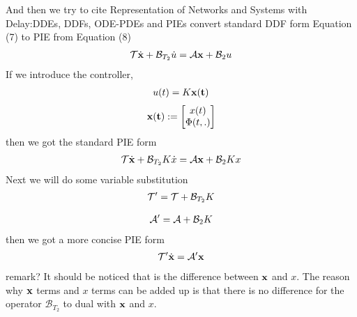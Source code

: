 \documentclass[twocolumn]{autart}    %
\begin{document}
And then we try to cite Representation of Networks and Systems with Delay:DDEs, DDFs, ODE-PDEs and PIEs convert standard DDF form Equation (7) to PIE from Equation (8) 
\begin{equation}
    \begin{aligned}
        \setlength{\arraycolsep}{0.9pt}
        \mathcal{T}\dot{\bold{x}}+\mathcal{B}_{T_{2}}\dot{u} = \mathcal{A}\bold{x}+\mathcal{B}_{2}u
    \end{aligned}
\end{equation}
If we introduce the controller,
\begin{equation}
    \begin{aligned}
        \setlength{\arraycolsep}{0.9pt}
        u(t) = K\bold{x(t)}
    \end{aligned}
\end{equation}
\begin{equation}
    \begin{aligned}
        \setlength{\arraycolsep}{0.9pt}
        \bold{x(t)} := \begin{bmatrix}
            x(t) \\
            \Phi(t,.)
        \end{bmatrix}\nonumber
    \end{aligned}
\end{equation}
then we got the standard PIE form 
\begin{equation}
    \begin{aligned}
        \setlength{\arraycolsep}{0.9pt}
        \mathcal{T}\dot{\bold{x}}+\mathcal{B}_{T_{2}}K\dot{x} = \mathcal{A}\bold{x}+\mathcal{B}_{2}Kx
    \end{aligned}
\end{equation}
Next we will do some variable substitution
\begin{equation}
    \begin{aligned}
        \setlength{\arraycolsep}{0.9pt}
        \mathcal{T}' = \mathcal{T}+\mathcal{B}_{T_{2}}K
    \end{aligned}
\end{equation}

\begin{equation}
    \begin{aligned}
        \setlength{\arraycolsep}{0.9pt}
        \mathcal{A}' = \mathcal{A}+\mathcal{B}_{2}K
    \end{aligned}
\end{equation}
then we got a more concise PIE form
\begin{equation}
    \begin{aligned}
        \setlength{\arraycolsep}{0.9pt}
        \mathcal{T}'\dot{\bold{x}} = \mathcal{A}'\bold{x}
    \end{aligned}
\end{equation}
remark?
It should be noticed that is the difference between $\bold{x}$ and $x$.
The reason why $\bold{x}$ terms and $x$ terms can be added up is that there is no difference
for the operator $\mathcal{B}_{T_{2}}$ to dual with $\bold{x}$ and $x$.
\end{document}
